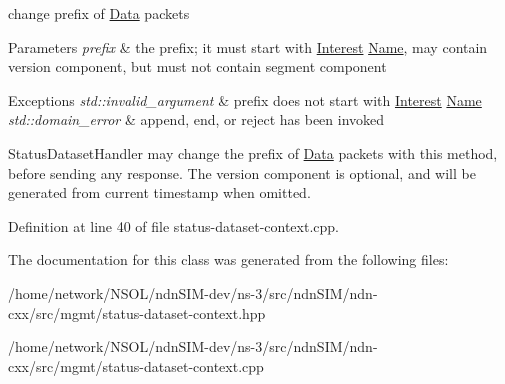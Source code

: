 change prefix of \hyperlink{classndn_1_1Data}{Data} packets 


\begin{DoxyParams}{Parameters}
{\em prefix} & the prefix; it must start with \hyperlink{classndn_1_1Interest}{Interest} \hyperlink{classndn_1_1Name}{Name}, may contain version component, but must not contain segment component \\
\hline
\end{DoxyParams}

\begin{DoxyExceptions}{Exceptions}
{\em std\+::invalid\+\_\+argument} & prefix does not start with \hyperlink{classndn_1_1Interest}{Interest} \hyperlink{classndn_1_1Name}{Name} \\
\hline
{\em std\+::domain\+\_\+error} & append, end, or reject has been invoked\\
\hline
\end{DoxyExceptions}
Status\+Dataset\+Handler may change the prefix of \hyperlink{classndn_1_1Data}{Data} packets with this method, before sending any response. The version component is optional, and will be generated from current timestamp when omitted. 

Definition at line 40 of file status-\/dataset-\/context.\+cpp.



The documentation for this class was generated from the following files\+:\begin{DoxyCompactItemize}
\item 
/home/network/\+N\+S\+O\+L/ndn\+S\+I\+M-\/dev/ns-\/3/src/ndn\+S\+I\+M/ndn-\/cxx/src/mgmt/status-\/dataset-\/context.\+hpp\item 
/home/network/\+N\+S\+O\+L/ndn\+S\+I\+M-\/dev/ns-\/3/src/ndn\+S\+I\+M/ndn-\/cxx/src/mgmt/status-\/dataset-\/context.\+cpp\end{DoxyCompactItemize}
